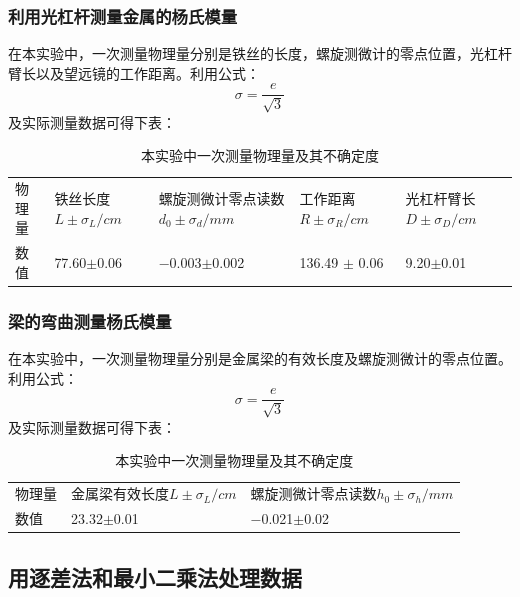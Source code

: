 \documentclass{ctexart}
\begin{document}
\subsubsection{利用光杠杆测量金属的杨氏模量}
在本实验中，一次测量物理量分别是铁丝的长度，螺旋测微计的零点位置，光杠杆臂长以及望远镜的工作距离。利用公式：
$$\sigma=\frac{e}{\sqrt{3}}$$
及实际测量数据可得下表：
\begin{table}[H]
  \centering
  \caption{本实验中一次测量物理量及其不确定度}
  \resizebox{\textwidth}{!}
  {
    \begin{tabular}{lllll}
    物理量   & 铁丝长度$L \pm \sigma_L /cm$ & 螺旋测微计零点读数$d_0 \pm \sigma_d /mm$ & 工作距离$R \pm \sigma_R /cm $ & 光杠杆臂长$D \pm \sigma_D /cm$ \\
    数值    & 77.60$\pm$0.06 & $-$0.003$\pm$0.002 & 136.49 $\pm$ 0.06 & 9.20$\pm$0.01 \\
    \end{tabular}%
  }
  \label{tab:addlabel}%
\end{table}%
\subsubsection{梁的弯曲测量杨氏模量}
在本实验中，一次测量物理量分别是金属梁的有效长度及螺旋测微计的零点位置。利用公式：
$$\sigma=\frac{e}{\sqrt{3}}$$
及实际测量数据可得下表：
\begin{table}[htbp]
  \centering
  \caption{本实验中一次测量物理量及其不确定度}
    \begin{tabular}{lll}
    物理量   & 金属梁有效长度$L\pm \sigma_L/cm$ & 螺旋测微计零点读数$h_0 \pm \sigma_h /mm$ \\
    数值    & 23.32$\pm$0.01 & $-$0.021$\pm$0.02 \\
    \end{tabular}%
  \label{tab:addlabel}%
\end{table}%
\subsection{用逐差法和最小二乘法处理数据}
\end{document}

